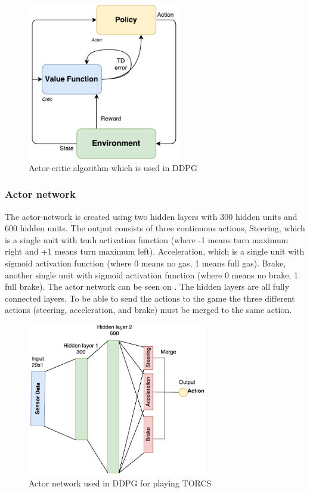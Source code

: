 \begin{figure}[H]
	\centering
	\includegraphics[width=0.6\textwidth]{Figures/Architecture/DDPG/Actor_critic_architecture.pdf}
	\caption{Actor-critic algorithm which is used in DDPG}
	\label{fig:Actor_critic_architecture}
\end{figure}

\subsubsection{Actor network}
The actor-network is created using two hidden layers with 300 hidden units and 600 hidden units. The output consists of three continuous actions, Steering, which is a single unit with tanh activation function (where -1 means turn maximum right and +1 means turn maximum left). Acceleration, which is a single unit with sigmoid activation function (where 0 means no gas, 1 means full gas). Brake, another single unit with sigmoid activation function (where 0 means no brake, 1 full brake). The actor network can be seen on . The hidden layers are all fully connected layers. To be able to send the actions to the game the three different actions (steering, acceleration, and brake) must be merged to the same action.

\begin{figure}[H]
	\centering
	\includegraphics[width=0.7\textwidth]{Figures/Architecture/DDPG/DDPG_Actor_network.pdf}
	\caption{Actor network used in DDPG for playing TORCS }
	\label{fig:DDPG_Actor_network}
\end{figure}  


